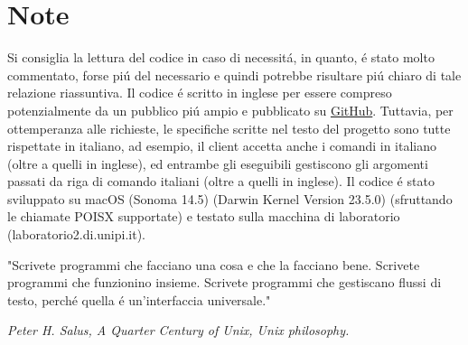 \chapter*{Note}

Si consiglia la lettura del codice in caso di necessit\'a, in quanto, \'e stato molto commentato, forse pi\'u del necessario e quindi potrebbe risultare pi\'u chiaro di tale relazione riassuntiva. Il codice \'e scritto in inglese per essere compreso potenzialmente da un pubblico pi\'u ampio e pubblicato su {\color{cyan}\href{https://github.com/JuliusNixi/Boggle}{GitHub}}. Tuttavia, per ottemperanza alle richieste, le specifiche scritte nel testo del progetto sono tutte rispettate in italiano, ad esempio, il client accetta anche i comandi in italiano (oltre a quelli in inglese), ed entrambe gli eseguibili gestiscono gli argomenti passati da riga di comando italiani (oltre a quelli in inglese). Il codice \'e stato sviluppato su macOS (Sonoma 14.5) (Darwin Kernel Version 23.5.0) (sfruttando le chiamate POISX supportate) e testato sulla macchina di laboratorio (laboratorio2.di.unipi.it).

\vspace*{5mm}

\epigraph{"Scrivete programmi che facciano una cosa e che la facciano bene. Scrivete programmi che funzionino insieme. Scrivete programmi che gestiscano flussi di testo, perch\'e quella \'e un'interfaccia universale."}{\textit{Peter H. Salus, A Quarter Century of Unix, Unix philosophy. }}

